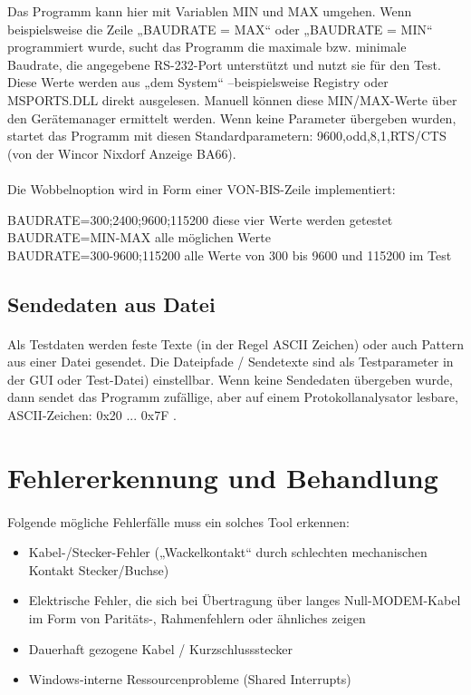 Das Programm kann hier mit Variablen MIN und MAX umgehen. Wenn beispielsweise die Zeile „BAUDRATE = MAX“ oder „BAUDRATE = MIN“  programmiert wurde,  sucht das Programm die maximale bzw. minimale Baudrate, die angegebene RS-232-Port unterstützt und nutzt sie für den Test. Diese Werte werden aus „dem System“ –beispielsweise Registry oder  MSPORTS.DLL direkt ausgelesen. Manuell können diese MIN/MAX-Werte über den Gerätemanager ermittelt werden. Wenn keine Parameter übergeben wurden, startet das Programm mit diesen Standardparametern: 9600,odd,8,1,RTS/CTS (von der Wincor Nixdorf Anzeige BA66).

\paragraph{}
Die Wobbelnoption wird in Form einer VON-BIS-Zeile implementiert:

\begin{tabbing}
\hspace*{10mm} BAUDRATE=300;2400;9600;115200 \= diese vier Werte werden getestet
\\
\hspace*{10mm} BAUDRATE=MIN-MAX \>alle möglichen Werte
\\
\hspace*{10mm} BAUDRATE=300-9600;115200 \>alle Werte von 300 bis 9600 und 115200 im Test
\end{tabbing}


\subsection{Sendedaten aus Datei}
\paragraph{}
Als Testdaten werden feste Texte (in der Regel ASCII Zeichen) oder auch Pattern aus einer Datei gesendet. Die Dateipfade / Sendetexte sind als Testparameter in der GUI oder Test-Datei) einstellbar. Wenn keine Sendedaten übergeben wurde, dann sendet das Programm zufällige, aber auf einem Protokollanalysator lesbare, ASCII-Zeichen: 0x20 ... 0x7F .


\section{Fehlererkennung und Behandlung}
\paragraph{}
Folgende mögliche Fehlerfälle muss ein solches Tool erkennen:
\begin{itemize}
\item Kabel-/Stecker-Fehler („Wackelkontakt“ durch schlechten mechanischen Kontakt Stecker/Buchse) 
\item Elektrische Fehler, die sich bei Übertragung über langes Null-MODEM-Kabel im Form von Paritäts-, Rahmenfehlern oder ähnliches zeigen
\item Dauerhaft gezogene Kabel / Kurzschlussstecker
\item Windows-interne Ressourcenprobleme (Shared Interrupts)
\end{itemize} 

